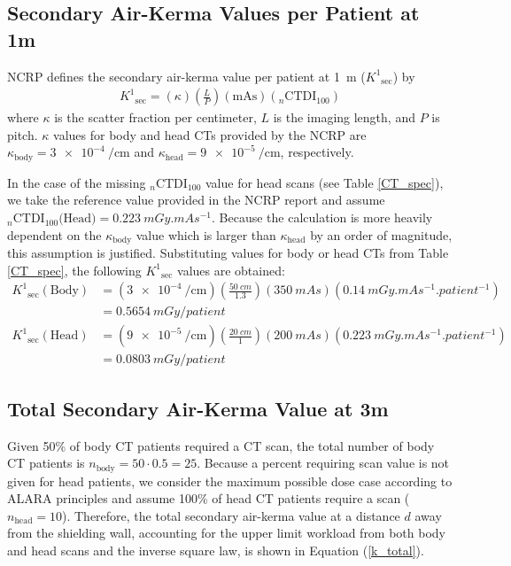 \documentclass[%
aps,
mph,%
amsmath,amssymb,
preprint,%
tightenlines,
longbibliography,
superscriptaddress,
floatfix,
nofootinbib,
]{revtex4-2}
\begin{document}
    \subsection{Secondary Air-Kerma Values per Patient at 1\hspace{0.85pt}m}
        NCRP defines the secondary air-kerma value per patient at \SI{1}{m} ($K^1\mathrm{_{sec}}$) by
        \begin{align} \label{k_patient}
                K^1\mathrm{_{sec}} = \left(\kappa\right) \left( \frac{L}{P}\right) \left(\mathrm{mAs}\right) \left(_n\mathrm{CTDI}_{100}\right)
        \end{align}
        where $\kappa$ is the scatter fraction per centimeter, $L$ is the imaging length, and $P$ is pitch. $\kappa$ values for body and head CTs provided by the NCRP are $\kappa\mathrm{_{body}} = \SI{3e-4}{\per \cm}$ and $\kappa\mathrm{_{head}} = \SI{9e-5}{\per \cm}$, respectively.  

        In the case of the missing $_n\mathrm{CTDI}_{100}$ value for head scans (see Table \ref{CT_spec}), we take the reference value provided in the NCRP report and assume $_n\mathrm{CTDI}_{100}\text{(Head)} = \qty[mode = text]{0.223}{mGy.mAs^{-1}}$. Because the calculation is more heavily dependent on the $\kappa\mathrm{_{body}}$ value which is larger than $\kappa\mathrm{_{head}}$ by an order of magnitude, this assumption is justified. Substituting values for body or head CTs from Table \ref{CT_spec}, the following $ K^1\mathrm{_{sec}}$ values are obtained:
        \begin{align*}
            K^1\mathrm{_{sec}(Body)} &= \left(\SI{3e-4}{\per \cm}\right)\left(\frac{\SI{50}{cm}}{1.3}\right)(\SI{350}{mAs})\left(\qty[mode = text]{0.14}{mGy.mAs^{-1}.patient^{-1}}\right) \\
            &= \SI{0.5654}{mGy/patient}\\
            K^1\mathrm{_{sec}(Head)} &= \left(\SI{9e-5}{\per \cm}\right)\left(\frac{\SI{20}{cm}}{1}\right)(\SI{200}{mAs})\left(\qty[mode = text]{0.223}{mGy.mAs^{-1}.patient^{-1}}\right) \\
            &= \SI{0.0803}{mGy/patient}
        \end{align*}

    \subsection{Total Secondary Air-Kerma Value at 3\hspace{0.85pt}m}
        Given 50\% of body CT patients required a CT scan, the total number of body CT patients is $n\mathrm{_{body}} = 50\cdot0.5 = 25$. Because a percent requiring scan value is not given for head patients, we consider the maximum possible dose case according to ALARA principles and assume 100\% of head CT patients require a scan ($n\mathrm{_{head}} = 10$). Therefore, the total secondary air-kerma value at a distance $d$ away from the shielding wall, accounting for the upper limit workload from both body and head scans and the inverse square law, is shown in Equation (\ref{k_total}). 
\end{document}
